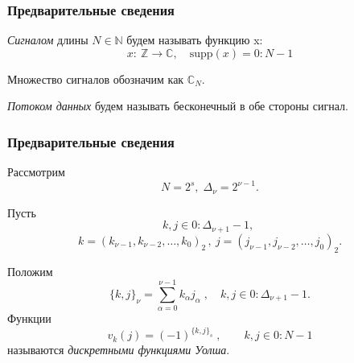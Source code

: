 \documentclass[notes=only]{beamer}
\begin{document}
\begin{frame}\frametitle{Предварительные сведения}
  \emph{Сигналом} длины $N \in \mathbb{N}$ будем называть функцию x:
  \begin{equation}
    x:\: \mathbb{Z} \rightarrow \mathbb{C}, \quad \mathrm{supp} (x) = 0:N-1 
  \end{equation}

  Множество сигналов обозначим как $\mathbb{C}_N$.

  \emph{Потоком данных} будем называть бесконечный в обе стороны сигнал.
  
\end{frame}
    
  
\begin{frame}\frametitle{Предварительные сведения}
Рассмотрим 
\[
N = 2^s, \; \Delta_\nu = 2^{\nu - 1}.
\]

Пусть 
\[
k,j \in 0 : \Delta_{\nu+1}-1, \;
\]
\[
k=(k_{\nu-1},k_{\nu-2},\ldots,k_0)_2 \, , \: 
j=(j_{\nu-1},j_{\nu-2},\ldots,j_0)_2. 
\]

Положим 
\[
\{k,j\}_\nu = \sum_{\alpha=0}^{\nu-1} k_\alpha j_\alpha \; , \quad k,j \in 0: \Delta_{\nu+1} - 1.
\]
Функции 
\begin{equation}
v_k(j) = (-1)^{{\{k,j\}}_s} \;, \qquad k,j \in 0:N-1
\end{equation}
называются \emph{дискретными функциями Уолша}.


\end{frame}
    
  
\end{document}
